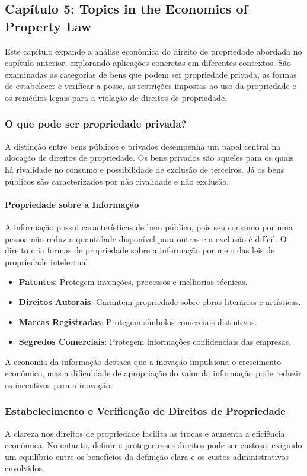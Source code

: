 \documentclass[a4paper,12pt]{article}[abntex2]
\begin{document}
\subsection{\textbf{Capítulo 5: Topics in the Economics of Property Law}}

Este capítulo expande a análise econômica do direito de propriedade abordada no capítulo anterior, explorando aplicações concretas em diferentes contextos. São examinadas as categorias de bens que podem ser propriedade privada, as formas de estabelecer e verificar a posse, as restrições impostas ao uso da propriedade e os remédios legais para a violação de direitos de propriedade.

\subsubsection{O que pode ser propriedade privada?}
A distinção entre bens públicos e privados desempenha um papel central na alocação de direitos de propriedade. Os bens privados são aqueles para os quais há rivalidade no consumo e possibilidade de exclusão de terceiros. Já os bens públicos são caracterizados por não rivalidade e não exclusão.

\paragraph{Propriedade sobre a Informação}
A informação possui características de bem público, pois seu consumo por uma pessoa não reduz a quantidade disponível para outras e a exclusão é difícil. O direito cria formas de propriedade sobre a informação por meio das leis de propriedade intelectual:
\begin{itemize}
    \item \textbf{Patentes}: Protegem invenções, processos e melhorias técnicas.
    \item \textbf{Direitos Autorais}: Garantem propriedade sobre obras literárias e artísticas.
    \item \textbf{Marcas Registradas}: Protegem símbolos comerciais distintivos.
    \item \textbf{Segredos Comerciais}: Protegem informações confidenciais das empresas.
\end{itemize}

A economia da informação destaca que a inovação impulsiona o crescimento econômico, mas a dificuldade de apropriação do valor da informação pode reduzir os incentivos para a inovação.

\subsubsection{Estabelecimento e Verificação de Direitos de Propriedade}
A clareza nos direitos de propriedade facilita as trocas e aumenta a eficiência econômica. No entanto, definir e proteger esses direitos pode ser custoso, exigindo um equilíbrio entre os benefícios da definição clara e os custos administrativos envolvidos.
\end{document}
